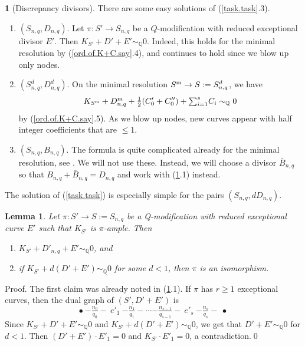 \documentclass{amsart}
\newtheorem{lem}[thm]{Lemma}
\theoremstyle{definition}
\newtheorem{say}[thm]{}
\theoremstyle{remark}
\newcommand{\q}[0]{{\mathbb Q}}
\newcommand{\simq}[0]{\sim_{\q}}
\newcommand{\tsum}[0]{\textstyle{\sum}}
\begin{document}
\begin{say}[Discrepancy divisors] \label{P.mod.P.mod.c.lem}
  There are some easy  solutions of (\ref{task.task}.3).
\begin{enumerate}
\item
  $(S_{n,q}, D_{n,q})$.    Let $\pi:S'\to S_{n,q}$ be a $Q$-modification
  with reduced exceptional divisor $E'$. Then
  $K_{S'}+D'+E'\simq 0$.
 Indeed, this holds for the minimal resolution by (\ref{ord.of.K+C.say}.4), and continues to hold  since we blow up only nodes.
\item   $(S^d_{n,q}, D^d_{n,q})$.
  On the minimal resolution $S^{\rm m}\to S:=S^d_{n,q}$, we have
  $$
  K_{S^{\rm m}}+D^{\rm m}_{n,q}+ \tfrac12(C'_0+C''_0)+\tsum _{i=1}^s C_i\simq 0
  $$
  by (\ref{ord.of.K+C.say}.5).
  As we blow up nodes, new curves appear with  half integer coefficients that are
  $\leq 1$.
\item $(S_{n,q}, B_{n,q})$.  The formula is quite complicated already for the minimal resolution, see \cite[3.32--34]{kk-singbook}.
  We will not use these. Instead, we will choose a divisor  $\bar B_{n,q}$ so that $B_{n,q}+ \bar B_{n,q}=D_{n,q}$ and work with (\ref{P.mod.P.mod.c.lem}.1) instead.
  \end{enumerate}
\end{say}



The solution of  (\ref{task.task}) is especially simple for the pairs  $(S_{n,q}, dD_{n,q})$.

\begin{lem} \label{Dnq.triv.lem} Let $\pi:S'\to S:=S_{n,q}$ be a Q-modification
  with reduced exceptional curve $E'$ such that
  $K_{S'}$ is $\pi$-ample. Then
  \begin{enumerate}
  \item $K_{S'}+D'_{n,q}+E'\simq 0$, and
  \item if  $K_{S'}+d(D'+E')\simq 0$ for some $d<1$, then $\pi$ is an isomorphism.
    \end{enumerate}
\end{lem}

  Proof. The first claim was already noted in  (\ref{P.mod.P.mod.c.lem}.1).
  If $\pi$ has  $r\geq 1$ exceptional curves, then the  dual graph of $(S', D'+E')$ is
$$
   \bullet \ {-\boxed{\tfrac{n_0}{q_0}}-} \  e'_1 \  {-\boxed{\tfrac{n_1}{q_1}}-} \cdots  {-\boxed{\tfrac{n_{s-1}}{q_{s-1}}}-} \  e'_s \ {-\boxed{\tfrac{n_s}{q_s}}-} \ \bullet
   $$
   Since  $K_{S'}+D'+E'\simq 0$ and $K_{S'}+d(D'+E')\simq 0$, we get
   that $D'+E'\simq 0$ for  $d<1$. Then 
   $(D'+E')\cdot E'_1=0$ and  $K_{S'}\cdot E'_1=0$, a contradiction.\qed
\end{document}
